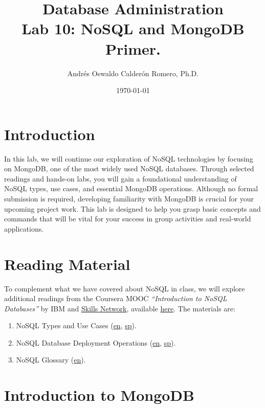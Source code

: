 \documentclass{article}
\title{Database Administration \\ Lab 10: NoSQL and MongoDB Primer.}
\author{Andrés Oswaldo Calderón Romero, Ph.D.}
\date{\today}
\begin{document}
\maketitle

\section{Introduction}
In this lab, we will continue our exploration of NoSQL technologies by focusing on MongoDB, one of the most widely used NoSQL databases. Through selected readings and hands-on labs, you will gain a foundational understanding of NoSQL types, use cases, and essential MongoDB operations. Although no formal submission is required, developing familiarity with MongoDB is crucial for your upcoming project work. This lab is designed to help you grasp basic concepts and commands that will be vital for your success in group activities and real-world applications.

\section{Reading Material}
To complement what we have covered about NoSQL in class, we will explore additional readings from the Coursera MOOC \textit{``Introduction to NoSQL Databases''} by IBM and \href{https://skills.network/}{Skills Network}, available \href{https://www.coursera.org/learn/introduction-to-nosql-databases}{here}. The materials are:

\begin{enumerate}
    \item NoSQL Types and Use Cases (\href{https://drive.google.com/file/d/1dgG_1JSRWCmeIBABfW83ykd6I1L0tCJJ/view?usp=sharing}{en}, \href{https://drive.google.com/file/d/1rqhSVxo7ci1MEieJIbGGbL3s-qxI1Ltr/view?usp=sharing}{sp}).
    \item NoSQL Database Deployment Operations (\href{https://drive.google.com/file/d/11wvBhvxNRG0HttqZ9p_SgdIaQMlDE9nt/view?usp=sharing}{en}, \href{https://drive.google.com/file/d/1gMjSwO69xOUUbY7pJ_Rs10uJ15oQYUUA/view?usp=sharing}{sp}).
    \item NoSQL Glossary (\href{https://drive.google.com/file/d/1XmvBUvBvYdzN6l4gS-Q6eavlJZm6m4DH/view?usp=sharing}{en}).
\end{enumerate}

\section{Introduction to MongoDB}
\end{document}
